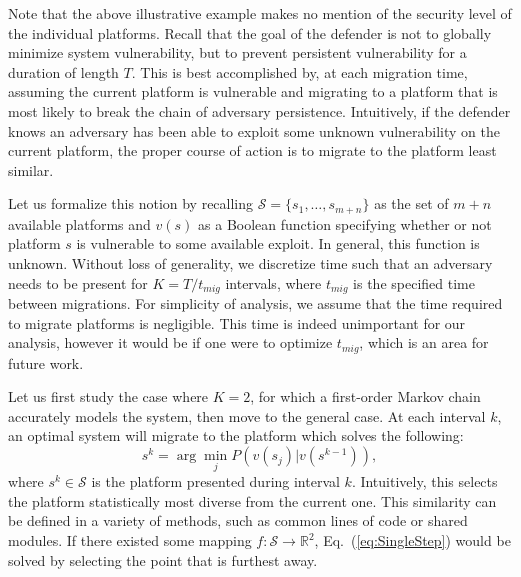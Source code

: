 \documentclass{acm_proc_article-sp}
\begin{document}
Note that the above illustrative example makes no mention of the security level of the individual platforms. Recall that the goal of the defender is not to globally minimize system vulnerability, but to prevent persistent vulnerability for a duration of length $T$. This is best accomplished by, at each migration time, assuming the current platform is vulnerable and migrating to a platform that is most likely to break the chain of adversary persistence. Intuitively, if the defender knows an adversary has been able to exploit some unknown vulnerability on the current platform, the proper course of action is to migrate to the platform least similar.

Let us formalize this notion by recalling $\mathcal{S}=\{s_{1},\ldots,s_{m+n}\}$ as the set of $m+n$ available platforms and $v(s)$ as a Boolean function specifying whether or not platform $s$ is vulnerable to some available exploit. In general, this function is unknown. Without loss of generality, we discretize time such that an adversary needs to be present for $K=T/t_{mig}$ intervals, where $t_{mig}$ is the specified time between migrations. For simplicity of analysis, we assume that the time required to migrate platforms is negligible. This time is indeed unimportant for our analysis, however it would be if one were to optimize $t_{mig}$, which is an area for future work.

Let us first study the case where $K=2$, for which a first-order Markov chain accurately models the system, then move to the general case. At each interval $k$, an optimal system will migrate to the platform which solves the following:
\begin{equation}
s^k=\arg\min_{j}P\left(v(s_{j})|v(s^{k-1})\right),\label{eq:SingleStep}
\end{equation}
where $s^k\in\mathcal{S}$ is the platform presented during interval $k$. Intuitively, this selects the platform statistically most diverse from the current one. This similarity can be defined in a variety of methods, such as common lines of code or shared modules. If there existed some mapping $f:\mathcal{S}\rightarrow\mathbb{R}^{2}$, Eq.\ (\ref{eq:SingleStep}) would be solved by selecting the point that is furthest away.
\end{document}
